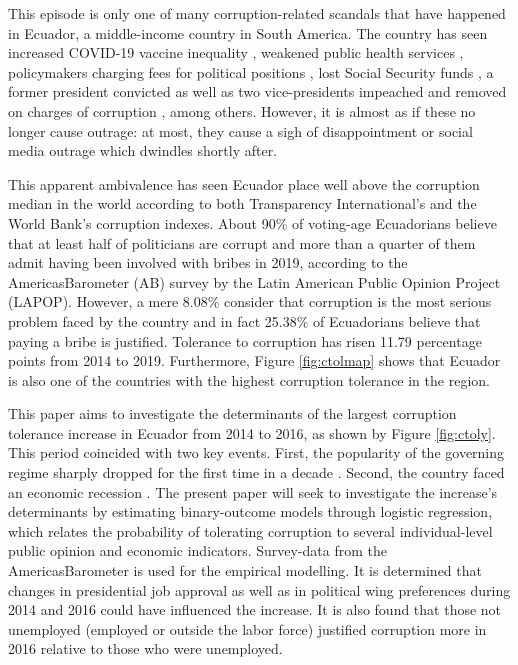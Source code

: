 \documentclass[12pt,a4]{article}
\begin{document}
This episode is only one of many corruption-related scandals that have happened in Ecuador, a middle-income country in South America. The country has seen increased COVID-19 vaccine inequality \parencite{Taj.2021}, weakened public health services \parencite{Celi.2020}, policymakers charging fees for political positions \parencite{Espinosa.2021}, lost Social Security funds \parencite{Pesantes.9152020}, a former president convicted \parencite{Valencia.2020} as well as two vice-presidents impeached and removed on charges of corruption \parencite{Cabrera.2020}, among others. However, it is almost as if these no longer cause outrage: at most, they cause a sigh of disappointment or social media outrage which dwindles shortly after.

This apparent ambivalence has seen Ecuador place well above the corruption median in the world according to both Transparency International's and the World Bank's corruption indexes. About 90\% of voting-age Ecuadorians believe that at least half of politicians are corrupt and more than a quarter of them admit having been involved with bribes in 2019, according to the AmericasBarometer (AB) survey by the Latin American Public Opinion Project (LAPOP). However, a mere 8.08\% consider that corruption is the most serious problem faced by the country and in fact 25.38\% of Ecuadorians believe that paying a bribe is justified. Tolerance to corruption has risen 11.79 percentage points from 2014 to 2019. Furthermore, Figure \ref{fig:ctolmap} shows that Ecuador is also one of the countries with the highest corruption tolerance in the region.

This paper aims to investigate the determinants of the largest corruption tolerance increase in Ecuador from 2014 to 2016, as shown by Figure \ref{fig:ctoly}. This period coincided with two key events. First, the popularity of the governing regime sharply dropped for the first time in a decade \parencite{Quillupangui.2016}. Second, the country faced an economic recession \parencite{Weisbrot.2017}. The present paper will seek to investigate the increase's determinants by estimating binary-outcome models through logistic regression, which relates the probability of tolerating corruption to several individual-level public opinion and economic indicators. Survey-data from the AmericasBarometer is used for the empirical modelling. It is determined that changes in presidential job approval as well as in political wing preferences during 2014 and 2016 could have influenced the increase. It is also found that those not unemployed (employed or outside the labor force) justified corruption more in 2016 relative to those who were unemployed.
\end{document}
